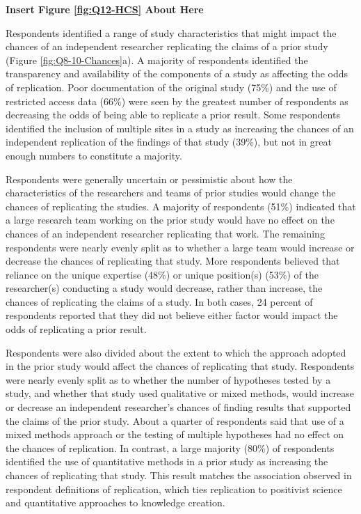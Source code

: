 \documentclass[]{interact}
\theoremstyle{plain}%
\theoremstyle{definition}
\theoremstyle{remark}
\begin{document}
\begin{center}
\textbf{Insert Figure \ref{fig:Q12-HCS} About Here}
\end{center}

Respondents identified a range of study characteristics that might impact the chances of an independent researcher replicating the claims of a prior study (Figure \ref{fig:Q8-10-Chances}a).
A majority of respondents identified the transparency and availability of the components of a study as affecting the odds of replication. 
Poor documentation of the original study (75\%) and the use of restricted access data (66\%) were seen by the greatest number of respondents as decreasing the odds of being able to replicate a prior result. 
Some respondents identified the inclusion of multiple sites in a study as increasing the chances of an independent replication of the findings of that study (39\%), but not in great enough numbers to constitute a majority. 

Respondents were generally uncertain or pessimistic about how the characteristics of the researchers and teams of prior studies would change the chances of replicating the studies. 
A majority of respondents (51\%) indicated that a large research team working on the prior study would have no effect on the chances of an independent researcher replicating that work. 
The remaining respondents were nearly evenly split as to whether a large team would increase or decrease the chances of replicating that study. 
More respondents believed that reliance on the unique expertise (48\%) or unique position(s) (53\%) of the researcher(s)  conducting a study would decrease, rather than increase, the chances of replicating the claims of a study.
In both cases, 24 percent of respondents reported that they did not believe either factor would impact the odds of replicating a prior result.

Respondents were also divided about the extent to which the approach adopted in the prior study would affect the chances of replicating that study. 
Respondents were nearly evenly split as to whether the number of hypotheses tested by a study, and whether that study used qualitative or mixed methods, would increase or decrease an independent researcher's chances of finding results that supported the claims of the prior study.
About a quarter of respondents said that use of a mixed methods approach or the testing of multiple hypotheses had no effect on the chances of replication.
In contrast, a large majority (80\%) of respondents identified the use of quantitative methods in a prior study as increasing the chances of replicating that study. 
This result matches the association observed in respondent definitions of replication, which ties replication to positivist science and quantitative approaches to knowledge creation.   
\end{document}
